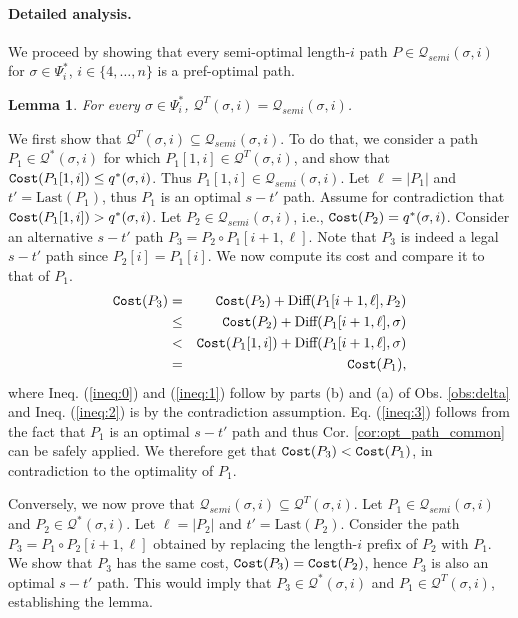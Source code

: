 \documentclass[12pt]{article}
\newtheorem{lemma}[theorem]{Lemma}
\def\Cost{\mbox{\tt Cost}}
\def\Proof{\par\noindent{\bf Proof:~}}
\newcommand{\DIFF}[0]{\mbox{Diff}}
\newcommand{\DegThreeConst}[0]{4}
\newcommand{\Last}[0]{\mathrm{Last}}
\def\Cost{\mbox{\tt Cost}}
\begin{document}
\paragraph{Detailed analysis.}
We proceed by showing that every semi-optimal length-$i$ path $P \in \mathcal{Q}_{semi}(\sigma,i)$ for $\sigma \in \Psi^{*}_{i}$, $i \in \{\DegThreeConst, \ldots,n\}$ is a pref-optimal path.
\begin{lemma}
\label{lem:con_subopt}
For every $\sigma \in \Psi^{*}_{i}$, $\mathcal{Q}^{T}(\sigma,i)=\mathcal{Q}_{semi}(\sigma,i)$.
\end{lemma}
\Proof
We first show that $\mathcal{Q}^{T}(\sigma,i) \subseteq \mathcal{Q}_{semi}(\sigma,i)$. To do that, we consider a path $P_1 \in \mathcal{Q}^{*}(\sigma,i)$ for which $P_1[1,i] \in \mathcal{Q}^{T}(\sigma,i)$,
and show that $\Cost(P_1[1, i])\leq q^{*}(\sigma,i)$. Thus $P_1[1,i] \in \mathcal{Q}_{semi}(\sigma,i)$.
Let $\ell=|P_1|$ and $t'=\Last(P_1)$, thus $P_1$ is an optimal $s-t'$ path.
Assume for contradiction that $\Cost(P_1[1, i])> q^{*}(\sigma,i)$. Let $P_2 \in \mathcal{Q}_{semi}(\sigma,i)$, i.e., $\Cost(P_2)=q^{*}(\sigma,i)$.  Consider an alternative $s-t'$ path $P_3=P_2 \circ P_1[i+1,\ell]$. Note that $P_3$ is indeed a legal $s-t'$ path since $P_2[i]=P_1[i]$. We now compute its cost and compare it to that of $P_1$.
\begin{eqnarray}
\Cost(P_3)&=& \Cost(P_2) + \DIFF(P_1[i+1,\ell],P_2) \label{ineq:0}
\\&\leq&
\Cost(P_2) + \DIFF(P_1[i+1,\ell],\sigma) \label{ineq:1}
\\&<&
\Cost(P_1[1, i]) + \DIFF(P_1[i+1,\ell],\sigma) \label{ineq:2}
\\&=&
\Cost(P_1), \label{ineq:3}
\end{eqnarray}
where Ineq. (\ref{ineq:0}) and (\ref{ineq:1}) follow by parts (b) and (a) of Obs. \ref{obs:delta} and Ineq. (\ref{ineq:2}) is by the contradiction assumption. Eq. (\ref{ineq:3}) follows from the fact that $P_1$ is an optimal $s-t'$ path and thus Cor. \ref{cor:opt_path_common} can be safely applied.
We therefore get that $\Cost(P_3)<\Cost(P_1)$, in contradiction to the optimality of $P_1$.
\par Conversely, we now prove that $\mathcal{Q}_{semi}(\sigma,i) \subseteq \mathcal{Q}^{T}(\sigma,i)$.
Let $P_1 \in \mathcal{Q}_{semi}(\sigma,i)$ and $P_2 \in \mathcal{Q}^{*}(\sigma,i)$. Let $\ell=|P_2|$ and $t'=\Last(P_2)$. Consider the path $P_3=P_1 \circ P_2[i+1, \ell]$ obtained by replacing the length-$i$ prefix of $P_2$ with $P_1$. We show that $P_3$ has the same cost, $\Cost(P_3)=\Cost(P_2)$, hence $P_3$ is also an optimal  $s-t'$ path. This would imply that $P_3 \in \mathcal{Q}^{*}(\sigma,i)$ and $P_1 \in \mathcal{Q}^{T}(\sigma,i)$, establishing the lemma.
\end{document}
